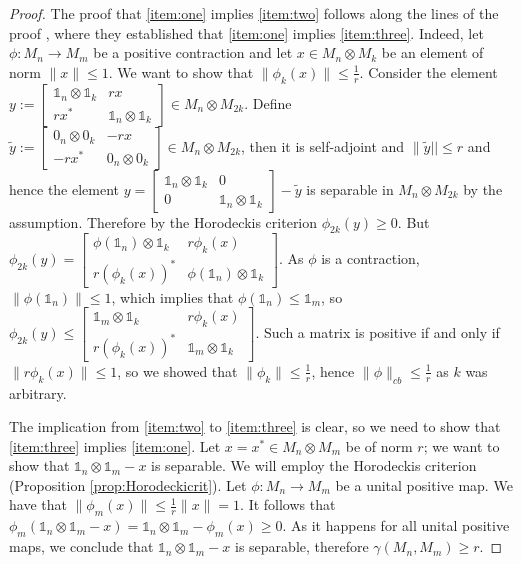 \documentclass[11pt]{article}
\numberwithin{theorem}{section}
\begin{document}
\begin{proof}
The proof that \eqref{item:one} implies \eqref{item:two} follows along the lines of the proof \cite[Theorem 3.7]{aubrun}, where they established that \eqref{item:one} implies \eqref{item:three}. Indeed, let $\phi: M_n \to M_{m}$ be a positive contraction and let $x \in M_{n} \otimes M_{k}$ be an element of norm $\|x\|\leqslant 1$. We want to show that $\|\phi_{k}(x)\|\leqslant \frac{1}{r}$. Consider the element $y:= \left[\begin{array}{cc} \mathds{1}_{n} \otimes \mathds{1}_{k} & rx \\ rx^{\ast} & \mathds{1}_{n} \otimes \mathds{1}_{k}\end{array}\right] \in M_{n} \otimes M_{2k}$. Define $\tilde{y}:=\left[\begin{array}{cc} 0_n\otimes 0_k & -rx \\ -rx^{\ast} & 0_{n} \otimes 0_{k}\end{array}\right] \in M_{n} \otimes M_{2k}$, then it is self-adjoint and $\|\tilde{y}||\leq r$ and hence the element $y=\left[\begin{array}{cc} \mathds{1}_{n} \otimes \mathds{1}_{k} & 0\\ 0 & \mathds{1}_{n} \otimes \mathds{1}_{k}\end{array}\right]- \tilde{y}$ is separable in $M_{n} \otimes M_{2k}$ by the assumption. Therefore by the Horodeckis criterion $\phi_{2k}(y)\geqslant 0$. But $\phi_{2k}(y) =  \left[\begin{array}{cc} \phi(\mathds{1}_{n}) \otimes \mathds{1}_{k} & r\phi_{k}(x) \\ r(\phi_{k}(x))^{\ast} & \phi(\mathds{1}_{n}) \otimes \mathds{1}_{k}\end{array}\right] $. As $\phi$ is a contraction, $\|\phi(\mathds{1}_{n})\|\leqslant 1$, which implies that $\phi(\mathds{1}_n) \leqslant \mathds{1}_m$, so $\phi_{2k}(y) \leqslant \left[\begin{array}{cc} \mathds{1}_{m} \otimes \mathds{1}_{k} & r\phi_{k}(x) \\ r(\phi_{k}(x))^{\ast} & \mathds{1}_{m} \otimes \mathds{1}_{k}\end{array}\right] $. Such a matrix is positive if and only if $\|r \phi_{k}(x)\|\leqslant 1$, so we showed that $\|\phi_{k}\| \leqslant \frac{1}{r}$, hence $\|\phi\|_{cb} \leqslant \frac{1}{r}$ as $k$ was arbitrary. 

The implication from \eqref{item:two} to \eqref{item:three} is clear, so we need to show that \eqref{item:three} implies \eqref{item:one}. Let $x=x^{\ast} \in M_{n} \otimes M_{m}$ be of norm $r$; we want to show that $\mathds{1}_{n} \otimes \mathds{1}_{m} -x$ is separable. We will employ the Horodeckis criterion (Proposition \ref{prop:Horodeckicrit}). Let $\phi: M_{n} \to M_{m}$ be a unital positive map. We have that $\|\phi_{m}(x)\| \leqslant \frac{1}{r} \|x\| = 1$. It follows that $\phi_{m}(\mathds{1}_{n}\otimes \mathds{1}_{m} - x) = \mathds{1}_{n} \otimes \mathds{1}_{m} - \phi_{m}(x) \geqslant 0$. As it happens for all unital positive maps, we conclude that $\mathds{1}_{n} \otimes \mathds{1}_{m} -x$ is separable, therefore $\gamma(M_{n}, M_{m}) \geqslant r$.
\end{proof}
\end{document}
